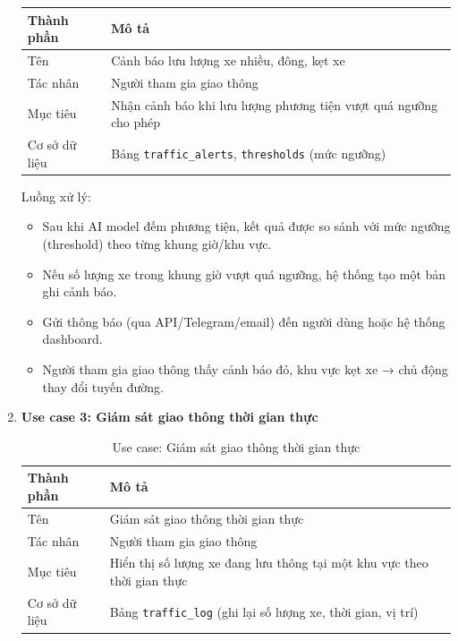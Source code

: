 \begin{enumerate}
    \begin{table}[H]
        \centering
        \begin{tabular}{|p{4cm}|p{10cm}|}
            \hline
            \textbf{Thành phần} & \textbf{Mô tả} \\ \hline
            Tên & Cảnh báo lưu lượng xe nhiều, đông, kẹt xe \\ \hline
            Tác nhân & Người tham gia giao thông \\ \hline
            Mục tiêu & Nhận cảnh báo khi lưu lượng phương tiện vượt quá ngưỡng cho phép \\ \hline
            Cơ sở dữ liệu & Bảng \texttt{traffic\_alerts}, \texttt{thresholds} (mức ngưỡng) \\ \hline
        \end{tabular}
    \end{table}
    \quad Luồng xử lý:
    \begin{itemize}
        \item Sau khi AI model đếm phương tiện, kết quả được so sánh với mức ngưỡng (threshold) theo từng khung giờ/khu vực.
        \item Nếu số lượng xe trong khung giờ vượt quá ngưỡng, hệ thống tạo một bản ghi cảnh báo.
        \item Gửi thông báo (qua API/Telegram/email) đến người dùng hoặc hệ thống dashboard.
        \item Người tham gia giao thông thấy cảnh báo đỏ, khu vực kẹt xe → chủ động thay đổi tuyến đường.
    \end{itemize}
    \item \textbf{Use case 3: Giám sát giao thông thời gian thực}
    \begin{table}[H]
        \centering
        \caption{Use case: Giám sát giao thông thời gian thực}
        \begin{tabular}{|p{4cm}|p{10cm}|}
            \hline
            \textbf{Thành phần} & \textbf{Mô tả} \\ \hline
            Tên & Giám sát giao thông thời gian thực \\ \hline
            Tác nhân & Người tham gia giao thông \\ \hline
            Mục tiêu & Hiển thị số lượng xe đang lưu thông tại một khu vực theo thời gian thực \\ \hline
            Cơ sở dữ liệu & Bảng \texttt{traffic\_log} (ghi lại số lượng xe, thời gian, vị trí) \\ \hline
        \end{tabular}
    \end{table}


\end{enumerate}
